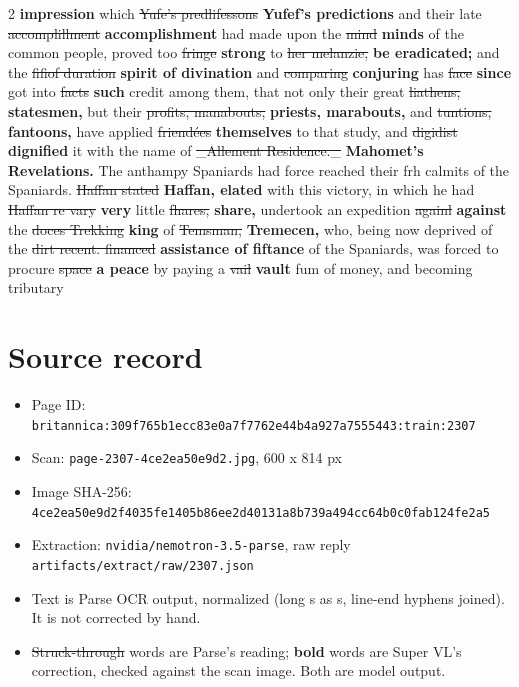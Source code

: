 \documentclass[10pt]{article}
\begin{document}
\begin{multicols}{2}
\textbf{impression} which \sout{Yufe’s predlifessons} \textbf{Yufef's predictions} and their late \sout{accomplillment} \textbf{accomplishment} had made upon the \sout{mind} \textbf{minds} of the common people, proved too \sout{fringe} \textbf{strong} to \sout{her melanzie,} \textbf{be eradicated;} and the \sout{fifiof duration} \textbf{spirit of divination} and \sout{comparing} \textbf{conjuring} has \sout{face} \textbf{since} got into \sout{facts} \textbf{such} credit among them, that not only their great \sout{liathens,} \textbf{statesmen,} but their \sout{profits, manabouts,} \textbf{priests, marabouts,} and \sout{tuntions,} \textbf{fantoons,} have applied \sout{friendées} \textbf{themselves} to that study, and \sout{digidist} \textbf{dignified} it with the name of \sout{\_Allement Residence.\_} \textbf{Mahomet's Revelations.} The anthampy Spaniards had force reached their frh calmits of the Spaniards. \sout{Haffan stated} \textbf{Haffan, elated} with this victory, in which he had \sout{Haffan re vary} \textbf{very} little \sout{fhares,} \textbf{share,} undertook an expedition \sout{againl} \textbf{against} the \sout{doces Trekking} \textbf{king} of \sout{Temsman,} \textbf{Tremecen,} who, being now deprived of the \sout{dirt recent. financed} \textbf{assistance of fiftance} of the Spaniards, was forced to procure \sout{space} \textbf{a peace} by paying a \sout{vail} \textbf{vault} fum of money, and becoming tributary
\end{multicols}
\section*{Source record}
\begin{itemize}
\item Page ID: \texttt{britannica:309f765b1ecc83e0a7f7762e44b4a927a7555443:train:2307}
\item Scan: \texttt{page-2307-4ce2ea50e9d2.jpg}, 600 x 814 px
\item Image SHA-256: \texttt{\small 4ce2ea50e9d2f4035fe1405b86ee2d40131a8b739a494cc64b0c0fab124fe2a5}
\item Extraction: \texttt{nvidia/nemotron-3.5-parse}, raw reply \texttt{artifacts/extract/raw/2307.json}
\item Text is Parse OCR output, normalized (long s as s, line-end hyphens joined). It is not corrected by hand.
\item \sout{Struck-through} words are Parse's reading; \textbf{bold} words are Super VL's correction, checked against the scan image. Both are model output.
\end{itemize}
\end{document}
